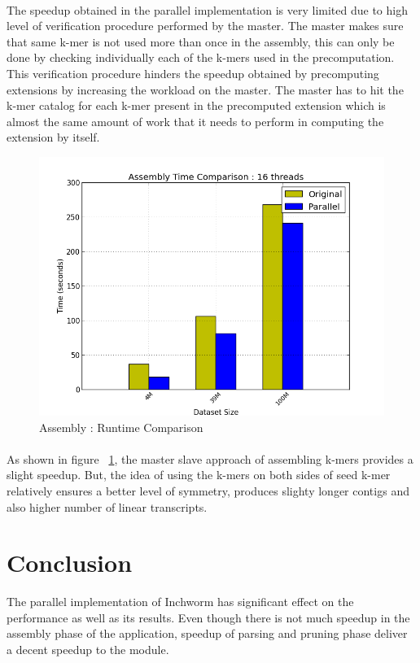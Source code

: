 \label{key}\documentclass[plainarticle, english ,zihtitle,final,hyperref,utf8]{zihpub}
\begin{document}
\paragraph{}
The speedup obtained in the parallel implementation is very limited due to high level of verification procedure performed by the master. The master makes sure that same k-mer is not used more than once in the assembly, this can only be done by checking individually each of the k-mers used in the precomputation. This verification procedure hinders the speedup obtained by precomputing extensions by increasing the workload on the master. The master has to hit the k-mer catalog for each k-mer present in the precomputed extension which is almost the same amount of work that it needs to perform in computing the extension by 
itself.
\begin{figure}[h]
\center
\includegraphics[scale=0.45]{compare-assembly}
\caption{Assembly : Runtime Comparison}
\label{assembly-compare}
\end{figure}
\paragraph{}
As shown in figure ~\ref{assembly-compare}, the master slave approach of assembling k-mers provides a slight speedup. But, the idea of using the k-mers on both sides of seed k-mer relatively ensures a better level of symmetry, produces slighty longer contigs and also higher number of linear transcripts. 
\section{Conclusion}
The parallel implementation of Inchworm has significant effect on the performance as well as its results. Even though there is not much speedup in the assembly phase of the application, speedup of parsing and pruning phase deliver a decent speedup to the module.
\end{document}
